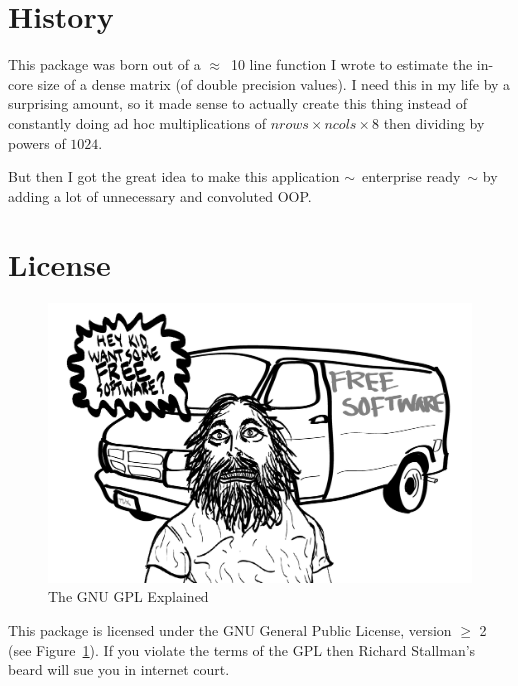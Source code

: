 \section{History}

This package was born out of a $\approx$~10 line function I wrote to estimate the in-core size of a dense matrix (of double precision values).  I need this in my life by a surprising amount, so it made sense to actually create this thing instead of constantly doing ad hoc multiplications of $nrows\times ncols \times 8$ then dividing by powers of $1024$.

But then I got the great idea to make this application $\sim$~enterprise ready~$\sim$ by adding a lot of unnecessary and convoluted OOP.



\section{License}

\begin{figure}[th]
  \centering
  \includegraphics[scale=.35]{./include/gpl.png}
  \caption{The GNU GPL Explained}
  \label{fig:gnu}
\end{figure}
This package is licensed under the GNU General Public License, version $\geq$ 2 (see Figure~\ref{fig:gnu}).
If you violate the terms of the GPL then Richard Stallman's beard will sue you in internet court.


